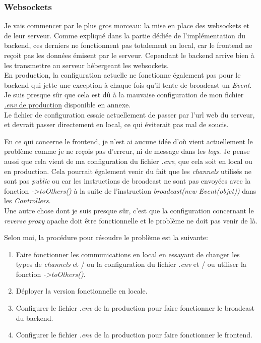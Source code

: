 \documentclass[
    iai, %
    il, %
]{heig-tb}
\begin{document}
\subsubsection{Websockets}
Je vais commencer par le plus gros morceau: la mise en place des \Gls{websockets} et de leur serveur.
Comme expliqué dans la partie dédiée de l'implémentation du \Gls{backend}, ces derniers ne fonctionnent pas totalement en local, car le \Gls{frontend} ne reçoit pas les données émisent par le serveur. Cependant le \Gls{backend} arrive bien à les transmettre au serveur hébergeant les \Gls{websockets}. \\
En production, la configuration actuelle ne fonctionne également pas pour le \Gls{backend} qui jette une exception à chaque fois qu'il tente de \Gls{broadcast} un \emph{Event}. Je suis presque sûr que cela est dû à la mauvaise configuration de mon fichier \href{https://github.com/heig-fablab/fablab-manager/blob/main/.env.prod.example}{\emph{.env} de production} disponible en annexe. \\
Le fichier de configuration essaie actuellement de passer par l'\Gls{url} web du serveur, et devrait passer directement en local, ce qui éviterait pas mal de soucis.

En ce qui concerne le \Gls{frontend}, je n'est ai aucune idée d'où vient actuellement le problème comme je ne reçois pas d'erreur, ni de message dans les \emph{logs}.
Je pense aussi que cela vient de ma configuration du fichier \emph{.env}, que cela soit en local ou en production.
Cela pourrait également venir du fait que les \emph{channels} utilisés ne sont pas \emph{public} ou car les instructions de \Gls{broadcast} ne sont pas envoyées avec la fonction \emph{->toOthers()} à la suite de l'instruction \emph{broadcast(new Event(objet))} dans les \emph{Controllers}. \\

Une autre chose dont je suis presque sûr, c'est que la configuration concernant le \emph{reverse proxy} \Gls{apache} doit être fonctionnelle et le problème ne doit pas venir de là.

Selon moi, la procédure pour résoudre le problème est la suivante:
\begin{enumerate}
    \item Faire fonctionner les communications en local en essayant de changer les types de \emph{channels} et / ou la configuration du fichier \emph{.env} et / ou utiliser la fonction \emph{->toOthers()}.
    \item Déployer la version fonctionnelle en locale.
    \item Configurer le fichier \emph{.env} de la production pour faire fonctionner le \Gls{broadcast} du \Gls{backend}.
    \item Configurer le fichier \emph{.env} de la production pour faire fonctionner le \Gls{frontend}.
\end{enumerate}
\end{document}
